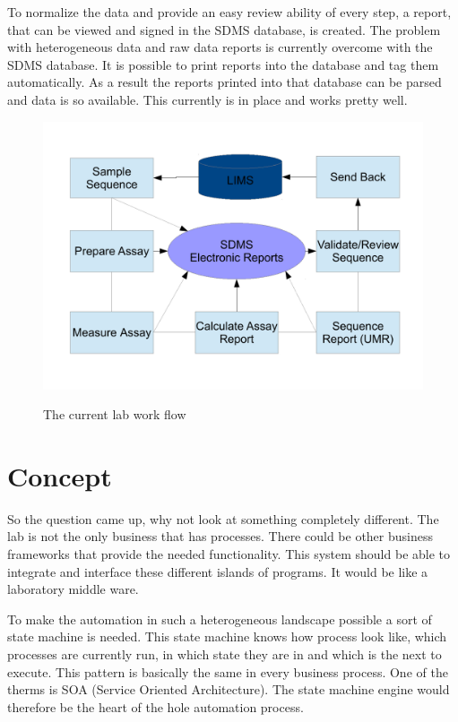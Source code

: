 \documentclass[paper=a4,twoside=false,BCOR=0mm,DIV=calc,fontsize=12pt]{scrartcl}
\begin{document}
To normalize the data and provide an easy review ability of every step, a report, that can be viewed and signed in the SDMS database, is created.
The problem with heterogeneous data and raw data reports is currently overcome with the SDMS database. It is possible to print reports into the database and tag them automatically. As a result the reports printed into that database can be parsed and data is so available. This currently is in place and works pretty well.


\begin{figure}
    \begin{center}
      \includegraphics[width=1\textwidth]{./img/Laboverview.pdf}\\
    \end{center}
  \caption{The current lab work flow}
  \label{CurrentLabWorkflow}
\end{figure} 




\section{Concept}
So the question came up, why not look at something completely different. The lab is not the only business that has processes. There could be other business frameworks that provide the needed functionality. This system should be able to integrate and interface these different islands of programs. It would be like a laboratory middle ware.

To make the automation in such a heterogeneous landscape possible a sort of state machine is needed. This state machine knows how process
look like, which processes are currently run, in which state they are in and which is the next to execute.
This pattern is basically the same in every business process. One of the therms is SOA (Service Oriented Architecture). The state machine engine would therefore be the heart of the hole automation process.
\end{document}

